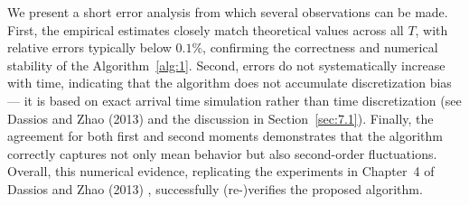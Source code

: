 \documentclass[12pt,a4paper]{report}
\theoremstyle{plain}
\theoremstyle{definition}
\theoremstyle{remark}
\newcommand{\1}{\mathbf{1}}
\begin{document}
\medskip
\noindent
We present a short error analysis from which several observations can be made. First, the empirical estimates closely match theoretical values across all $T$, with relative errors typically below $0.1\%$, confirming the correctness and numerical stability of the Algorithm~\ref{alg:1}. Second, errors do not systematically increase with time, indicating that the algorithm does not accumulate discretization bias — it is based on exact arrival time simulation rather than time discretization (see Dassios and Zhao (2013) and the discussion in Section~\ref{sec:7.1}). Finally, the agreement for both first and second moments demonstrates that the algorithm correctly captures not only mean behavior but also second-order fluctuations. Overall, this numerical evidence, replicating the experiments in Chapter~4 of Dassios and Zhao (2013) \cite{DZ13}, successfully (re-)verifies the proposed algorithm.
\end{document}
